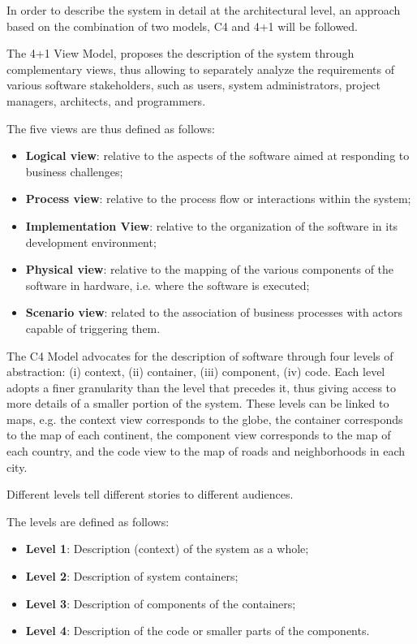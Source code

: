In order to describe the system in detail at the architectural level, an approach based on the combination of two models, C4 \parencite{c4model-site} and 4+1 \parencite{4plus1model} will be followed.

The 4+1 View Model, proposes the description of the system through complementary views, thus allowing to separately analyze the requirements of various software stakeholders, such as users, system administrators, project managers, architects, and programmers.

The five views are thus defined as follows:
\begin{itemize}
   \item \textbf{Logical view}: relative to the aspects of the software aimed at responding to business challenges;
   \item \textbf{Process view}: relative to the process flow or interactions within the system;
   \item \textbf{Implementation View}: relative to the organization of the software in its development environment;
   \item \textbf{Physical view}: relative to the mapping of the various components of the software in hardware, i.e. where the software is executed;
   \item \textbf{Scenario view}: related to the association of business processes with actors capable of triggering them.
\end{itemize}

The C4 Model advocates for the description of software through four levels of abstraction:
(i) context, (ii) container, (iii) component, (iv) code. Each level adopts a finer granularity than the level that precedes it, thus giving access to more details of a smaller portion of the system.
These levels can be linked to maps, e.g. the context view corresponds to the globe, the container corresponds to the map of each continent, the component view corresponds to the map of each country, and the code view to the map of roads and neighborhoods in each city.

Different levels tell different stories to different audiences.

The levels are defined as follows:

\begin{itemize}
   \item \textbf{Level 1}: Description (context) of the system as a whole;
   \item \textbf{Level 2}: Description of system containers;
   \item \textbf{Level 3}: Description of components of the containers;
   \item \textbf{Level 4}: Description of the code or smaller parts of the components.
\end{itemize}

